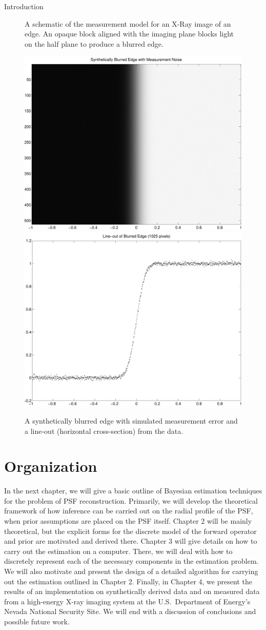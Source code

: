 \begin{chapter}{Introduction}
\begin{figure}
\begin{center}
\begin{tikzpicture}[scale=.8,every node/.style={minimum size=1cm},on grid]
    \end{tikzpicture}
  \caption{ A schematic of the measurement model for an X-Ray image of an edge. An opaque block aligned with the imaging plane blocks light on the half plane to produce a blurred edge.}\label{fig:edgePicture}
\end{center}
\end{figure}

\begin{figure}
\begin{center}
  \includegraphics[width=.45\textwidth]{figures/blurredEdgeData.pdf}
  \includegraphics[width=.45\textwidth]{figures/psfLineoutData.pdf}
  \caption{A synthetically blurred edge with simulated measurement error and a line-out (horizontal cross-section) from the data.} \label{fig:edgeData}
\end{center}
\end{figure}

  
\section{Organization}
  In the next chapter, we will give a basic outline of Bayesian estimation techniques for the problem of PSF reconstruction.
  Primarily, we will develop the theoretical framework of how inference can be carried out on the radial profile of the PSF, when prior assumptions are placed on the PSF itself.
  Chapter 2 will be mainly theoretical, but the explicit forms for the discrete model of the forward operator and prior are motivated and derived there.
  Chapter 3 will give details on how to carry out the estimation on a computer.
  There, we will deal with how to discretely represent each of the necessary components in the estimation problem.
  We will also motivate and present the design of a detailed algorithm for carrying out the estimation outlined in Chapter 2.
  Finally, in Chapter 4, we present the results of an implementation on synthetically derived data and on measured data from a high-energy X-ray imaging system at the U.S.~Department of Energy's Nevada National Security Site.
  We will end with a discussion of conclusions and possible future work.



\end{chapter}
